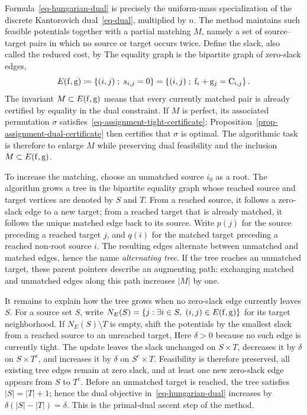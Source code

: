Formula~\eqref{eq-hungarian-dual} is precisely the uniform-mass specialization of the discrete Kantorovich dual~\eqref{eq-dual}, multiplied by $n$.
%
The method maintains such feasible potentials together with a partial matching $M$, namely a set of source--target pairs in which no source or target occurs twice. Define the slack, also called the reduced cost, by
The equality graph is the bipartite graph of zero-slack edges,
\[
	E(\mathrm{f},\mathrm{g})
	\coloneqq
	\left\{ (i,j) \;;\; s_{i,j}=0 \right\}
	=
	\left\{ (i,j) \;;\; \mathrm{f}_i+\mathrm{g}_j=\mathrm{C}_{i,j} \right\}.
\]
The invariant $M\subset E(\mathrm{f},\mathrm{g})$ means that every currently matched pair is already certified by equality in the dual constraint. If $M$ is perfect, its associated permutation $\sigma$ satisfies~\eqref{eq-assignment-tight-certificate}; Proposition~\ref{prop-assignment-dual-certificate} then certifies that $\sigma$ is optimal. The algorithmic task is therefore to enlarge $M$ while preserving dual feasibility and the inclusion $M\subset E(\mathrm{f},\mathrm{g})$.

To increase the matching, choose an unmatched source $i_0$ as a root. The algorithm grows a tree in the bipartite equality graph whose reached source and target vertices are denoted by $S$ and $T$. From a reached source, it follows a zero-slack edge to a new target; from a reached target that is already matched, it follows the unique matched edge back to its source. Write $p(j)$ for the source preceding a reached target $j$, and $q(i)$ for the matched target preceding a reached non-root source $i$. The resulting edges alternate between unmatched and matched edges, hence the name \emph{alternating tree}. If the tree reaches an unmatched target, these parent pointers describe an augmenting path: exchanging matched and unmatched edges along this path increases $|M|$ by one.

It remains to explain how the tree grows when no zero-slack edge currently leaves $S$. For a source set $S$, write $N_E(S)=\{j:\exists i\in S,\ (i,j)\in E(\mathrm{f},\mathrm{g})\}$ for its target neighborhood. If $N_E(S)\setminus T$ is empty, shift the potentials by the smallest slack from a reached source to an unreached target,
Here $\delta>0$ because no such edge is currently tight. The update leaves the slack unchanged on $S\times T$, decreases it by $\delta$ on $S\times T^c$, and increases it by $\delta$ on $S^c\times T$. Feasibility is therefore preserved, all existing tree edges remain at zero slack, and at least one new zero-slack edge appears from $S$ to $T^c$. Before an unmatched target is reached, the tree satisfies $|S|=|T|+1$; hence the dual objective in~\eqref{eq-hungarian-dual} increases by $\delta(|S|-|T|)=\delta$. This is the primal-dual ascent step of the method.

